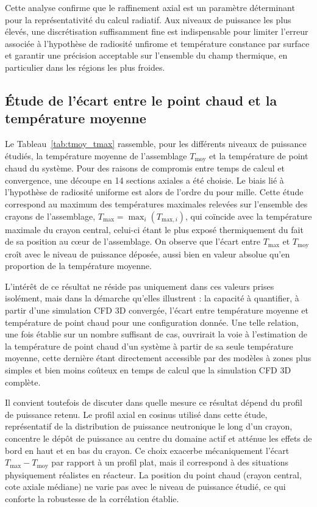 Cette analyse confirme que le raffinement axial est un paramètre déterminant pour la représentativité du calcul radiatif. Aux niveaux de puissance les plus élevés, une discrétisation suffisamment fine est indispensable pour limiter l'erreur associée à l'hypothèse de radiosité unfirome et température constance par surface et garantir une précision acceptable sur l'ensemble du champ thermique, en particulier dans les régions les plus froides.

\subsection{Étude de l'écart entre le point chaud et la température moyenne}

Le Tableau~\ref{tab:tmoy_tmax} rassemble, pour les différents niveaux de puissance étudiés, la température moyenne de l'assemblage $T_{\mathrm{moy}}$ et la température de point chaud du système. Pour des raisons de compromis entre temps de calcul et convergence, une découpe en 14 sections axiales a été choisie. Le biais lié à l'hypothèse de radiosité uniforme est alors de l'ordre du pour mille. Cette étude correspond au maximum des températures maximales relevées sur l'ensemble des crayons de l'assemblage, $T_{\mathrm{max}} = \max_i \left( T_{\mathrm{max},i} \right)$, qui coïncide avec la température maximale du crayon central, celui-ci étant le plus exposé thermiquement du fait de sa position au cœur de l'assemblage. On observe que l'écart entre $T_{\mathrm{max}}$ et $T_{\mathrm{moy}}$ croît avec le niveau de puissance déposée, aussi bien en valeur absolue qu'en proportion de la température moyenne.

L'intérêt de ce résultat ne réside pas uniquement dans ces valeurs prises isolément, mais dans la démarche qu'elles illustrent : la capacité à quantifier, à partir d'une simulation CFD 3D convergée, l'écart entre température moyenne et température de point chaud pour une configuration donnée. Une telle relation, une fois établie sur un nombre suffisant de cas, ouvrirait la voie à l'estimation de la température de point chaud d'un système à partir de sa seule température moyenne, cette dernière étant directement accessible par des modèles à zones plus simples et bien moins coûteux en temps de calcul que la simulation CFD 3D complète.

Il convient toutefois de discuter dans quelle mesure ce résultat dépend du profil de puissance retenu. Le profil axial en cosinus utilisé dans cette étude, représentatif de la distribution de puissance neutronique le long d'un crayon, concentre le dépôt de puissance au centre du domaine actif et atténue les effets de bord en haut et en bas du crayon. Ce choix exacerbe mécaniquement l'écart $T_{\mathrm{max}} - T_{\mathrm{moy}}$ par rapport à un profil plat, mais il correspond à des situations physiquement réalistes en réacteur. La position du point chaud (crayon central, cote axiale médiane) ne varie pas avec le niveau de puissance étudié, ce qui conforte la robustesse de la corrélation établie.

